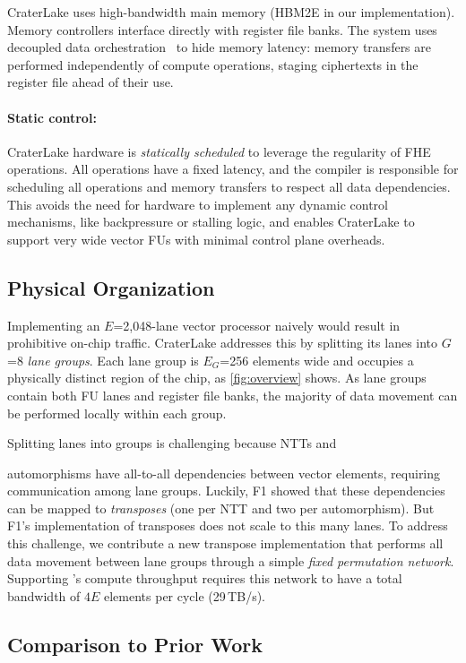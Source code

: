 CraterLake uses high-bandwidth main memory (HBM2E in our implementation).
Memory controllers interface directly with register file banks. The system uses
decoupled data orchestration~\cite{pellauer:asplos19:buffets} to hide memory
latency: memory transfers are performed independently of compute operations,
staging ciphertexts in the register file ahead of their use.

\paragraph{Static control:}
CraterLake hardware is \emph{statically scheduled} to leverage the regularity
of FHE operations. All operations have a fixed latency, and the compiler is
responsible for scheduling all operations and memory transfers to respect all
data dependencies. This avoids the need for hardware to implement any dynamic
control mechanisms, like backpressure or stalling logic, and enables CraterLake
to support very wide vector FUs with minimal control plane overheads.

\subsection{Physical Organization}
\label{sec:tiling}
Implementing an $E$=2,048-lane vector processor naively would result in
prohibitive on-chip traffic. CraterLake addresses this by splitting its lanes
into $G$=8 \emph{lane groups}. Each lane group is $E_G$=256 elements wide and
occupies a physically distinct region of the chip, as \autoref{fig:overview}
shows. As lane groups contain both FU lanes and register file banks, the
majority of data movement can be performed locally within each group.

Splitting lanes into groups is challenging because NTTs and

\noindent automorphisms have all-to-all dependencies between vector elements,
requiring communication among lane groups. Luckily, F1 showed that these
dependencies can be mapped to \emph{transposes} (one per NTT and two per
automorphism). But F1's implementation of transposes does not scale to this
many lanes. To address this challenge, we contribute a new transpose
implementation that performs all data movement between lane groups through a
simple \emph{fixed permutation network}. Supporting \name's compute throughput
requires this network to have a total bandwidth of $4E$ elements per cycle
(29\,TB/s).

\subsection{Comparison to Prior Work}
\label{sec:comparison}

